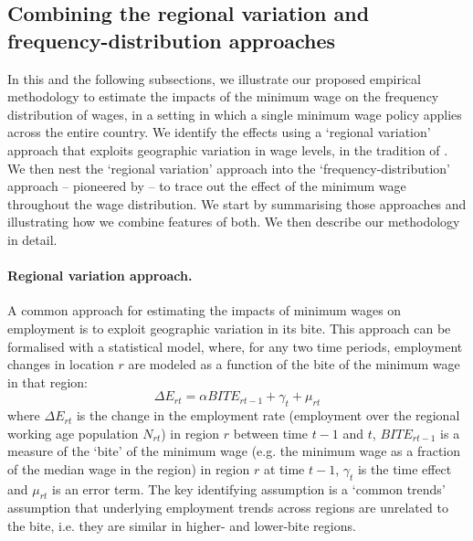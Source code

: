 \subsection{Combining the regional variation and frequency-distribution approaches} \label{sec:lm_identification}
In this and the following subsections, we illustrate our proposed empirical methodology to estimate the impacts of the minimum wage on the frequency distribution of wages, in a setting in which a single minimum wage policy applies across the entire country. We identify the effects using a `regional variation' approach that exploits geographic variation in wage levels, in the tradition of \cite{Card1992}. We then nest the `regional variation' approach into the `frequency-distribution' approach -- pioneered by \cite{Cengiz2019} -- to trace out the effect of the minimum wage throughout the wage distribution. We start by summarising those approaches and illustrating how we combine features of both. We then describe our methodology in detail. \par 

\paragraph{Regional variation approach.} A common approach for estimating the impacts of minimum wages on employment is to exploit geographic variation in its bite. This approach can be formalised with a statistical model, where, for any two time periods, employment changes in location $r$ are modeled as a function of the bite of the minimum wage in that region: 
\begin{equation} \label{eq:regional_variation}
    \Delta E_{rt} = \alpha BITE_{rt-1}+ \gamma_t + \mu_{rt}
\end{equation}
where $\Delta E_{rt}$ is the change in the employment rate (employment over the regional working age population $N_{rt}$) in region $r$ between time $t-1$ and $t$, $BITE_{rt-1}$ is a measure of the `bite' of the minimum wage (e.g. the minimum wage as a fraction of the median wage in the region) in region $r$ at time $t-1$, $\gamma_t$ is the time effect and $\mu_{rt}$ is an error term. The key identifying assumption is a `common trends' assumption that underlying employment trends across regions are unrelated to the bite, i.e. they are similar in higher- and lower-bite regions. 

